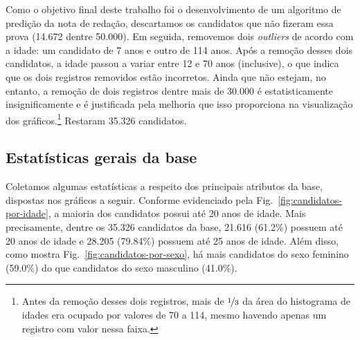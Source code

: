 \documentclass[12pt]{article}
\newcommand{\reffig}[1]{Fig.~\ref{fig:#1}}
\begin{document}
Como o objetivo final deste trabalho foi o desenvolvimento de um algoritmo de predição da nota de redação, descartamos os candidatos que não fizeram essa prova (14.672 dentre 50.000).
Em seguida, removemos dois \emph{outliers} de acordo com a idade: um candidato de 7 anos e outro de 114 anos.
Após a remoção desses dois candidatos, a idade passou a variar entre 12 e 70 anos (inclusive), o que indica que os dois registros removidos estão incorretos.
Ainda que não estejam, no entanto, a remoção de dois registros dentre mais de 30.000 é estatisticamente insignificamente e é justificada pela melhoria que isso proporciona na visualização dos gráficos.\footnote{Antes da remoção desses dois registros, mais de $\nicefrac{1}{3}$ da área do histograma de idades era ocupado por valores de 70 a 114, mesmo havendo apenas um registro com valor nessa faixa.}
Restaram 35.326 candidatos.

\subsection{Estatísticas gerais da base}
\label{subsec:estatisticas-gerais}
Coletamos algumas estatísticas a respeito dos principais atributos da base, dispostas nos gráficos a seguir.
Conforme evidenciado pela \reffig{candidatos-por-idade}, a maioria dos candidatos possui até 20 anos de idade.
Mais precisamente, dentre os 35.326 candidatos da base, 21.616 (61.2\%) possuem até 20 anos de idade e 28.205 (79.84\%) possuem até 25 anos de idade.
Além disso, como mostra \reffig{candidatos-por-sexo}, há mais candidatos do sexo feminino (59.0\%) do que candidatos do sexo masculino (41.0\%).
\end{document}
